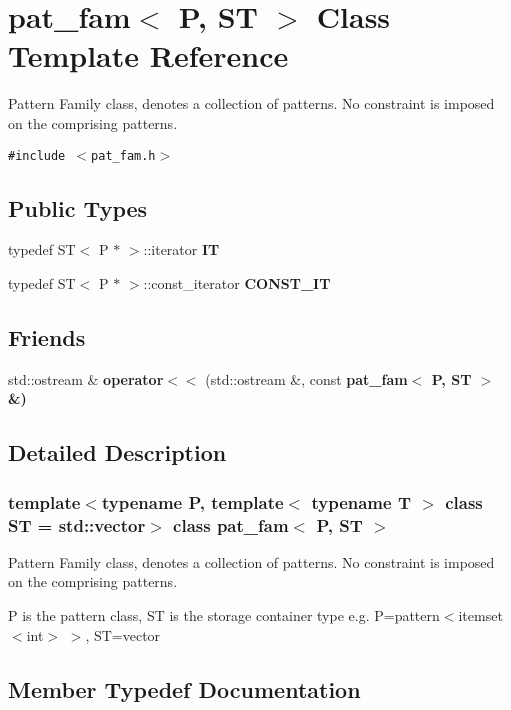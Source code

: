 \section{pat\_\-fam$<$ P, ST $>$ Class Template Reference}
\label{classpat__fam}
Pattern Family class, denotes a collection of patterns. No constraint is imposed on the comprising patterns.  


{\tt \#include $<$pat\_\-fam.h$>$}

\subsection*{Public Types}
\begin{CompactItemize}
\item 
typedef ST$<$ P $\ast$ $>$::iterator \bf{IT}
\item 
typedef ST$<$ P $\ast$ $>$::const\_\-iterator \bf{CONST\_\-IT}
\end{CompactItemize}
\subsection*{Friends}
\begin{CompactItemize}
\item 
std::ostream \& \textbf{operator$<$$<$} (std::ostream \&, const \bf{pat\_\-fam}$<$ P, ST $>$ \&)\label{classpat__fam_f6f4b78da6b3a1dace1eb683f32bde9c}

\end{CompactItemize}


\subsection{Detailed Description}
\subsubsection*{template$<$typename P, template$<$ typename T $>$ class ST = std::vector$>$ class pat\_\-fam$<$ P, ST $>$}

Pattern Family class, denotes a collection of patterns. No constraint is imposed on the comprising patterns. 

P is the pattern class, ST is the storage container type e.g. P=pattern$<$itemset$<$int$>$ $>$, ST=vector 



\subsection{Member Typedef Documentation}
